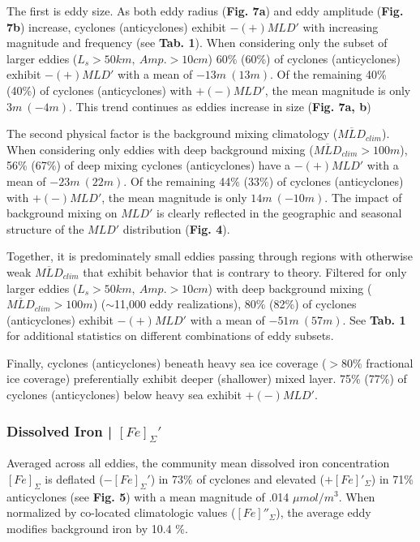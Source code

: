The first is eddy size. As both eddy radius (\textbf{Fig. 7a}) and eddy amplitude (\textbf{Fig. 7b}) increase, cyclones (anticyclones) exhibit $-(+) MLD'$ with increasing magnitude and frequency (see \textbf{Tab. 1}). When considering only the subset of larger eddies ($L_s>50km, \  Amp.>10cm$) 60\% (60\%) of cyclones (anticyclones) exhibit $-(+) MLD'$  with a mean of $-13m \ (13m)$. Of the remaining 40\% (40\%) of cyclones (anticyclones) with $+(-) MLD'$, the mean magnitude is only 
$3m \ (-4m)$. This trend continues as eddies increase in size (\textbf{Fig. 7a, b})

The second physical factor is the background mixing climatology ($\overline{MLD}_{clim}$). When considering only eddies with deep background mixing ($\overline{MLD}_{clim}>100m$), 56\% (67\%) of deep mixing cyclones (anticyclones) have a $-(+) MLD'$ with a mean of $-23m \ (22m)$. Of the remaining 44\% (33\%) of cyclones (anticyclones) with $+(-) MLD'$, the mean magnitude is only $14m \ (-10m)$. The impact of background mixing on $MLD'$ is clearly reflected in the geographic and seasonal structure of the $MLD'$ distribution (\textbf{Fig. 4}). 

Together, it is predominately small eddies passing through regions with otherwise weak $\overline{MLD}_{clim}$ that exhibit behavior that is contrary to theory. Filtered for only larger eddies ($L_s>50km, \ Amp.>10cm$) with deep background mixing ($\overline{MLD}_{clim}>100m$) ($\sim$11,000 eddy realizations), 80\% (82\%) of cyclones (anticyclones) exhibit $-(+)MLD'$ with a mean of $-51m \ (57m)$. See \textbf{Tab. 1} for additional statistics on different combinations of eddy subsets.

Finally, cyclones (anticyclones) beneath heavy sea ice coverage ($>80$\% fractional ice coverage)  preferentially exhibit deeper (shallower) mixed layer. 75\% (77\%) of cyclones (anticyclones) below heavy sea exhibit $+(-)MLD'$. 



\subsubsection{Dissolved Iron |  $[Fe]_\Sigma'$}

Averaged across all eddies, the community mean dissolved iron concentration $[Fe]_\Sigma$ is deflated ($-[Fe]_\Sigma'$) in 73\% of cyclones and elevated ($+[Fe]'_\Sigma$) in 71\% anticyclones (see \textbf{Fig. 5}) with a mean magnitude of .014 $\mu mol/m^3$. When normalized by co-located climatologic values ($[Fe]''_\Sigma$), the average eddy modifies background iron by 10.4 \%.

